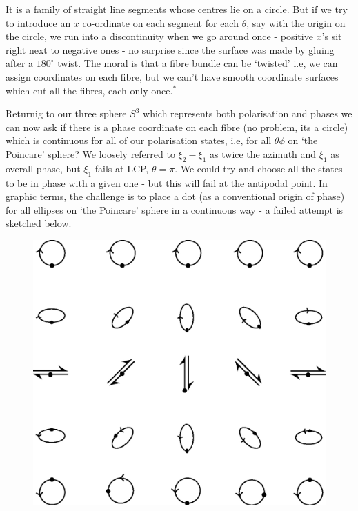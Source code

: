 It is a family of straight line segments whose centres lie on a circle.  
But if we try to introduce an $x$ co-ordinate on each segment for each $\theta$,
say with the origin on the circle, we run into a discontinuity when we go around
once - positive $x$'s sit right next to negative ones - no surprise since the surface
was made by gluing after a $180^{\circ}$ twist. The moral is that a fibre bundle can
be `twisted' i.e, we can assign coordinates on each fibre, but we can't have smooth
coordinate surfaces which cut all the fibres, each only once.$^{\ast}$

Returnig to our three sphere $S^3$ which represents both polarisation and
phases we can now ask if there is a phase coordinate on each fibre (no problem,
its a circle) which is continuous for all of our polarisation states, i.e, for all $\theta \phi$
on `the Poincare' sphere? We loosely referred to $\xi_2 - \xi_1$ as twice the azimuth and
$\xi_1$ as overall phase, but $\xi_1$ fails at LCP, $\theta = \pi$. We could try and choose all the
states to be in phase with a given one - but this will fail at the antipodal point.
In graphic terms, the challenge is to place a dot (as a conventional origin of phase)
for all ellipses on `the Poincare' sphere in a continuous way - a failed attempt is
sketched below.
\bigskip

\begin{figure}[H]
\centering
\includegraphics[scale=0.22]{src/images/chap26/18.jpg}
\end{figure}
\bigskip

